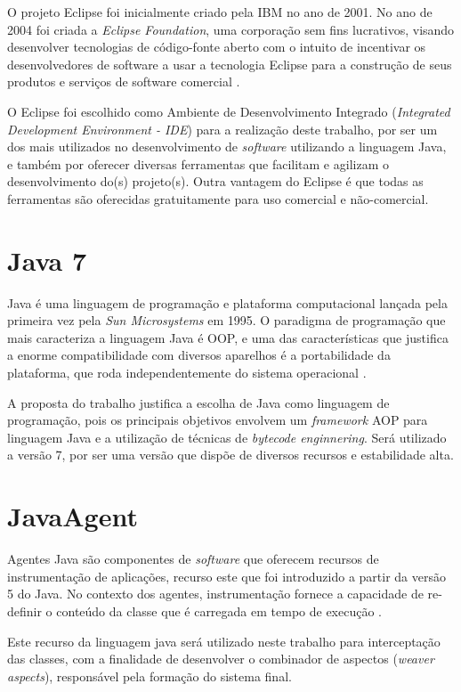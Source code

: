 \documentclass[tc,oneside]{iiufrgs}
\begin{document}
O projeto Eclipse foi inicialmente criado pela IBM no ano de 2001. No ano de 2004 foi criada a \textit{Eclipse Foundation}, uma corporação sem fins lucrativos, visando desenvolver tecnologias de código-fonte aberto com o intuito de incentivar os desenvolvedores de software a usar a tecnologia Eclipse para a construção de seus produtos e serviços de software comercial \cite{eclipsefoundation}.

O Eclipse foi escolhido como Ambiente de Desenvolvimento Integrado (\textit{Integrated Development Environment - IDE}) para a realização deste trabalho, por ser um dos mais utilizados no desenvolvimento de \textit{software} utilizando a linguagem Java, e também por oferecer diversas ferramentas que facilitam e agilizam o desenvolvimento do(s) projeto(s). Outra vantagem do Eclipse é que todas as ferramentas são oferecidas gratuitamente para uso comercial e não-comercial. 
\section{Java 7}

Java é uma linguagem de programação e plataforma computacional lançada pela primeira vez pela \textit{Sun Microsystems} em 1995.  O paradigma de programação que mais caracteriza a linguagem Java é OOP,  e uma das características que justifica a enorme compatibilidade com diversos aparelhos é a portabilidade da plataforma, que roda independentemente do sistema operacional \cite{stark2001java}. 

A proposta do trabalho justifica a escolha de Java como linguagem de programação, pois os principais objetivos envolvem um \textit{framework} AOP para linguagem Java e a utilização de técnicas de \textit{bytecode enginnering}. Será utilizado a versão 7, por ser uma versão que dispõe de diversos recursos e estabilidade alta.

\section{JavaAgent}

Agentes Java são componentes de \textit{software} que oferecem recursos de instrumentação de aplicações, recurso este que foi introduzido a partir da versão 5 do Java. No contexto dos agentes, instrumentação fornece a capacidade de re-definir o conteúdo da classe que é carregada  em tempo de execução \cite{javaagents}.

Este recurso da linguagem java será utilizado neste trabalho para interceptação das classes, com a finalidade de desenvolver o combinador de aspectos (\textit{weaver aspects}), responsável pela formação do sistema final.
\end{document}
